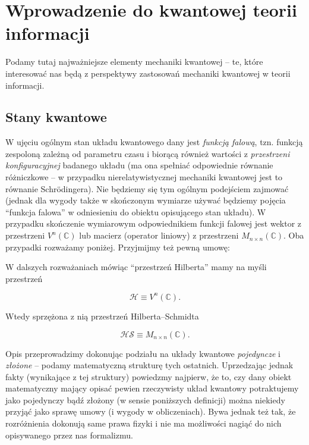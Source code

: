 \section{Wprowadzenie do kwantowej teorii informacji}

Podamy tutaj najważniejsze elementy mechaniki kwantowej -- te, które interesować nas będą z perspektywy zastosowań mechaniki kwantowej w teorii informacji.

\subsection{Stany kwantowe}

W ujęciu ogólnym stan układu kwantowego dany jest \textit{funkcją falową}, tzn. funkcją zespoloną zależną od parametru czasu i biorącą również wartości z \textit{przestrzeni konfiguracyjnej} badanego układu (ma ona spełniać odpowiednie równanie różniczkowe -- w przypadku nierelatywistycznej mechaniki kwantowej jest to równanie Schr\"{o}dingera). Nie będziemy się tym ogólnym podejściem zajmować (jednak dla wygody także w skończonym wymiarze używać będziemy pojęcia ``funkcja falowa'' w odniesieniu do obiektu opisującego stan układu). W przypadku skończenie wymiarowym odpowiednikiem funkcji falowej jest wektor z przestrzeni $V ^ n(\mathbb{C})$ lub macierz (operator liniowy) z przestrzeni $M_{n \times n}(\mathbb{C})$. Oba przypadki rozważamy poniżej. Przyjmijmy też pewną umowę:

\begin{convention}
    \label{convention:space}
    W dalszych rozważaniach mówiąc ``przestrzeń Hilberta'' mamy na myśli przestrzeń

    \begin{equation}
        \label{equation:states}
        \mathcal{H} \equiv V^n(\mathbb{C}).
    \end{equation}

    Wtedy sprzężona z nią przestrzeń Hilberta--Schmidta

    \begin{equation}
        \label{equation:operators}
        \mathcal{HS} \equiv M_{n \times n}(\mathbb{C}).
    \end{equation}
\end{convention}

Opis przeprowadzimy dokonując podziału na układy kwantowe \textit{pojedyncze} i \textit{złożone} -- podamy matematyczną strukturę tych ostatnich. Uprzedzając jednak fakty (wynikające z tej struktury) powiedzmy najpierw, że to, czy dany obiekt matematyczny mający opisać pewien rzeczywisty układ kwantowy potraktujemy jako pojedynczy bądź złożony (w sensie poniższych definicji) można niekiedy przyjąć jako sprawę umowy (i wygody w obliczeniach). Bywa jednak też tak, że rozróżnienia dokonują same prawa fizyki i nie ma możliwości nagiąć do nich opisywanego przez nas formalizmu.

